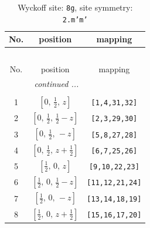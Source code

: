 \documentclass[fleqn,8pt]{jsarticle}
\begin{document}
\begin{longtable}{ccc}
\caption{Wyckoff site: {\tt 8g}, site symmetry: {\tt 2.m'm'}}
 \\
 \hline \hline
No. & position & mapping \\ \hline \endfirsthead

\multicolumn{2}{l}{\tablename\ \thetable{}} \\
 \hline \hline
No. & position & mapping \\ \hline \endhead

 \hline \hline
\multicolumn{2}{r}{\footnotesize\it continued ...} \\ \endfoot

 \hline \hline
\multicolumn{2}{r}{} \\ \endlastfoot

1 & $\left[ 0,\, \frac{1}{2},\, z \right]$ & {\tt [1,4,31,32]} \\ \hline
2 & $\left[ 0,\, \frac{1}{2},\, \frac{1}{2} - z \right]$ & {\tt [2,3,29,30]} \\ \hline
3 & $\left[ 0,\, \frac{1}{2},\, - z \right]$ & {\tt [5,8,27,28]} \\ \hline
4 & $\left[ 0,\, \frac{1}{2},\, z + \frac{1}{2} \right]$ & {\tt [6,7,25,26]} \\ \hline
5 & $\left[ \frac{1}{2},\, 0,\, z \right]$ & {\tt [9,10,22,23]} \\ \hline
6 & $\left[ \frac{1}{2},\, 0,\, \frac{1}{2} - z \right]$ & {\tt [11,12,21,24]} \\ \hline
7 & $\left[ \frac{1}{2},\, 0,\, - z \right]$ & {\tt [13,14,18,19]} \\ \hline
8 & $\left[ \frac{1}{2},\, 0,\, z + \frac{1}{2} \right]$ & {\tt [15,16,17,20]} \\
\end{longtable}
\renewcommand{\arraystretch}{1.2}
\end{document}
